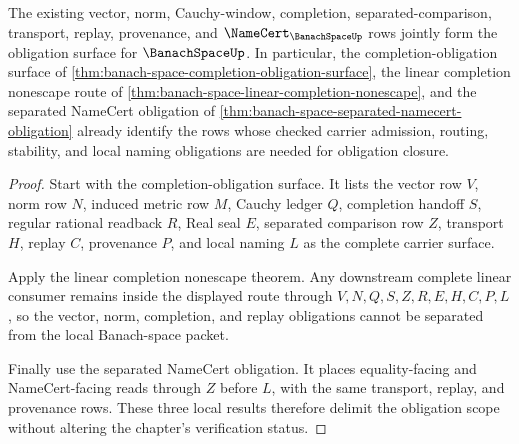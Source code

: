 \begin{theorem}
\label{thm:banach-space-obligation-upgrade-scope}
The existing vector, norm, Cauchy-window, completion, separated-comparison, transport, replay, provenance, and $\NameCert_{\BanachSpaceUp}$ rows jointly form the obligation surface for $\BanachSpaceUp$. In particular, the completion-obligation surface of \autoref{thm:banach-space-completion-obligation-surface}, the linear completion nonescape route of \autoref{thm:banach-space-linear-completion-nonescape}, and the separated NameCert obligation of \autoref{thm:banach-space-separated-namecert-obligation} already identify the rows whose checked carrier admission, routing, stability, and local naming obligations are needed for obligation closure.
\end{theorem}
\begin{proof}
Start with the completion-obligation surface. It lists the vector row $V$, norm row $N$, induced metric row $M$, Cauchy ledger $Q$, completion handoff $S$, regular rational readback $R$, Real seal $E$, separated comparison row $Z$, transport $H$, replay $C$, provenance $P$, and local naming $L$ as the complete carrier surface.

Apply the linear completion nonescape theorem. Any downstream complete linear consumer remains inside the displayed route through $V,N,Q,S,Z,R,E,H,C,P,L$, so the vector, norm, completion, and replay obligations cannot be separated from the local Banach-space packet.

Finally use the separated NameCert obligation. It places equality-facing and NameCert-facing reads through $Z$ before $L$, with the same transport, replay, and provenance rows. These three local results therefore delimit the obligation scope without altering the chapter's verification status.
\end{proof}

